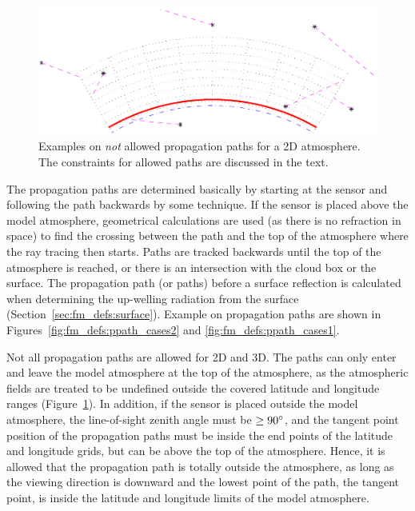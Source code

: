 \begin{figure}[!t]
 \begin{center}
  \includegraphics*[width=0.95\hsize]{Figs/fm_definitions/ppath_badcases}
  \caption{Examples on \emph{not} allowed propagation paths for a 2D 
    atmosphere. The constraints for allowed paths are discussed in the
    text.}
  \label{fig:fm_defs:ppath_badcases}
 \end{center}
\end{figure}


The propagation paths are determined basically by starting at the
sensor and following the path backwards by some  technique. If the sensor is placed above the model
atmosphere, geometrical calculations are used (as there is no
refraction in space) to find the crossing between the path and the top
of the atmosphere where the ray tracing then starts. Paths are tracked
backwards until the top of the atmosphere is reached, or there is an
intersection with the cloud box or the surface. The propagation path
(or paths) before a surface reflection is calculated when determining
the up-welling radiation from the surface
(Section~\ref{sec:fm_defs:surface}). Example on propagation
paths are shown in Figures~\ref{fig:fm_defs:ppath_cases2} and 
\ref{fig:fm_defs:ppath_cases1}.
 
Not all propagation paths are allowed for 2D and 3D. The paths can
only enter and leave the model atmosphere at the top of the
atmosphere, as the atmospheric fields are treated to be undefined
outside the covered latitude and longitude ranges
(Figure~\ref{fig:fm_defs:ppath_badcases}). In addition, if the sensor
is placed outside the model atmosphere, the line-of-sight zenith angle
must be $\geq90^\circ$, and the tangent point position of the
propagation paths must be inside the end points of the latitude and
longitude grids, but can be above the top of the atmosphere. Hence, it
is allowed that the propagation path is totally outside the
atmosphere, as long as the viewing direction is downward and the
lowest point of the path, the tangent point, is inside the latitude
and longitude limits of the model atmosphere.

